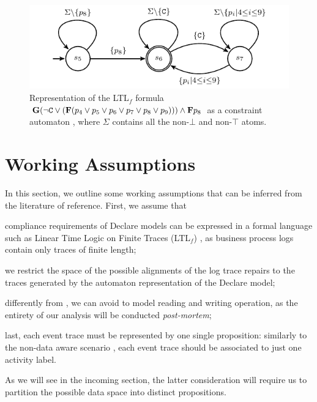 \begin{figure}[!t]
	\centering
%
\includegraphics[scale=0.9]{images/example_3_graph}
	\caption{Representation of the LTL$_f$ formula $\mathbf{G}(\neg\texttt{C}\vee(\mathbf{F}(p_4\vee p_5\vee p_6\vee p_7\vee p_8\vee p_9)))\wedge \mathbf{F} p_8$  as a constraint automaton \cite{Westergaard11}, where $\Sigma$ contains all the non-$\bot$ and non-$\top$ atoms.}
	\label{fig:g1g2}
\end{figure}

\section{Working Assumptions}\label{sec:wa}

In this section, we outline some working assumptions that can be inferred from the literature of reference. First, we assume that \begin{enumerate*}[label=\emph{\alph*})]
\item compliance requirements of Declare models can be expressed in a formal language such as Linear Time Logic on Finite Traces (LTL$_f$) \cite{GiacomoV13}, as business process logs contain only traces of finite length;
\item we restrict the space of the possible alignments of the log trace repairs to the traces generated by the automaton representation of the Declare model;
\item differently from \cite{MultiPerspective}, we can avoid to model reading and writing operation, as the entirety of our analysis will be conducted \textit{post-mortem}; \item last, each event trace must be represented by one single proposition: similarly to the non-data aware scenario \cite{XuLZ17a}, each event trace should be associated to just one activity label. \end{enumerate*} As we will see in the incoming section, the latter consideration will require us to partition the possible data space into distinct propositions.



